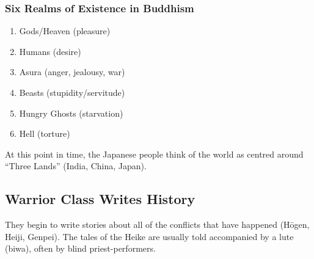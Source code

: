 \documentclass[class=article, crop=false]{standalone}
\begin{document}
  \subsubsection{Six Realms of Existence in Buddhism}
  \begin{enumerate}
    \item Gods/Heaven (pleasure)
    \item Humans (desire)
    \item Asura (anger, jealousy, war)
    \item Beasts (stupidity/servitude)
    \item Hungry Ghosts (starvation)
    \item Hell (torture)
  \end{enumerate}
  \begin{note}{}
    At this point in time, the Japanese people think of the world as centred around ``Three Lands'' (India, China, Japan).
  \end{note}
  \subsection{Warrior Class Writes History}
  They begin to write stories about all of the conflicts that have happened (H\=ogen, Heiji, Genpei). The tales of the Heike are usually told accompanied by a lute (biwa), often by blind priest-performers.
\end{document}
